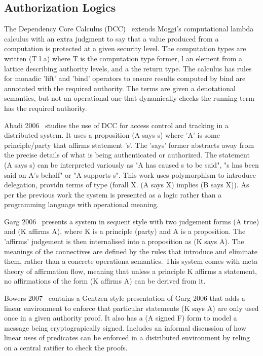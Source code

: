 \subsection{Authorization Logics}
The Dependency Core Calculus (DCC)~\cite{Abadi1999:DCC} extends Moggi's computational lambda calculus with an extra judgment to say that a value produced from a computation is protected at a given security level. The computation types are written (T l a) where T is the computation type former, l an element from a lattice describing authority levels, and a the return type. The calculus has rules for monadic 'lift' and 'bind' operators to ensure results computed by bind are annotated with the required authority. The terms are given a denotational semantics, but not an operational one that dynamically checks the running term has the required authority.

Abadi 2006~\cite{Abadi2007:AccessControl} studies the use of DCC for access control and tracking in a distributed system. It uses a proposition (A says s) where 'A' is some principle/party that affirms statement 's'. The 'says' former abstracts away from the precise details of what is being authenticated or authorized. The statement (A says s) can be interpreted variously as "A has caused s to be said", "s has been said on A's behalf" or "A supports s". This work uses polymorphism to introduce delegation, providn terms of type (forall X. (A says X) implies (B says X)). As per the previous work \cite{Abadi1999:DCC} the system is presented as a logic rather than a programming language with operational meaning.

Garg 2006~\cite{Garg2006:Constructive} presents a system in sequent style with two judgement forms (A true) and (K affirms A), where K is a principle (party) and A is a proposition. The 'affirms' judgement is then internalised into a proposition as (K says A). The meanings of the connectives are defined by the rules that introduce and eliminate them, rather than a concrete operationa semantics. This system comes with meta theory of affirmation flow, meaning that unless a principle K affirms a statement, no affirmations of the form (K affirms A) can be derived from it.

Bowers 2007~\cite{Bowers2007:Consumable} contains a Gentzen style presentation of Garg 2006 that adds a linear environment to enforce that particular statements (K says A) are only used once in a given authority proof. It also has a (A signed F) form to model a message being cryptograpically signed. Includes an informal discussion of how linear uses of predicates can be enforced in a distributed environment by reling on a central ratifier to check the proofs.

